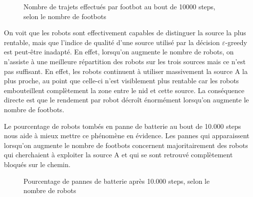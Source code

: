 \begin{figure}[htbp]
\centering
{}
\caption{Nombre de trajets effectués par footbot au bout de 10000 steps, selon le nombre de footbots}
\end{figure}

On voit que les robots sont effectivement capables de distinguer la source la plus rentable, mais que l'indice de qualité d'une source utilisé par la décision $\varepsilon$-greedy est peut-être inadapté. En effet, lorsqu'on augmente le nombre de robots, on n'assiste à une meilleure répartition des robots sur les trois sources mais ce n'est pas suffisant. En effet, les robots continuent à utiliser massivement la source A la plus proche, au point que celle-ci n'est visiblement plus rentable car les robots embouteillent complètement la zone entre le nid et cette source. La conséquence directe est que le rendement par robot décroît énormément lorsqu'on augmente le nombre de footbots.

Le pourcentage de robots tombés en panne de batterie au bout de 10.000 steps nous aide à mieux mettre ce phénomène en évidence. Les pannes qui apparaissent lorsqu'on augmente le nombre de footbots concernent majoritairement des robots qui cherchaient à exploiter la source A et qui se sont retrouvé complètement bloqués sur le chemin.

\begin{figure}[htbp]
\centering
{}
\caption{Pourcentage de pannes de batterie après 10.000 steps, selon le nombre de robots}
\end{figure}


